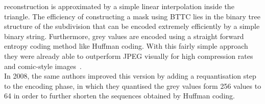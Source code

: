reconstruction is approximated by a simple linear interpolation inside the triangle. The efficiency
of constructing a mask using BTTC lies in the binary tree structure of the subdivision that can be encoded extremely
efficiently by a simple binary string. Furthermore, grey values are encoded using a straight
forward entropy
coding method like Huffman coding\cite{huffman}.
With this fairly simple approach they were already able to outperform JPEG visually for high
compression rates and comic-style images~\cite{galic05}.\\
In 2008, the same authors improved this version by adding a requantisation step to the encoding
phase, in which they quantised the grey values form 256 values to 64 in order to further shorten
the sequences obtained by Huffman coding.



